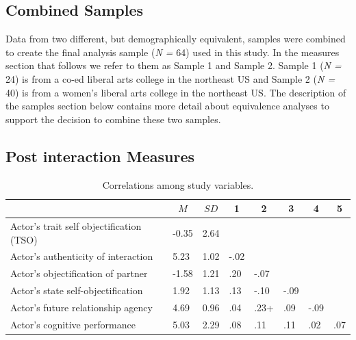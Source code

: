 \documentclass[man]{apa6}
\begin{document}
\subsection{Combined Samples}\label{combined-samples}

Data from two different, but demographically equivalent, samples were
combined to create the final analysis sample (\emph{N =} 64) used in
this study. In the measures section that follows we refer to them as
Sample 1 and Sample 2. Sample 1 (\emph{N =} 24) is from a co-ed liberal
arts college in the northeast US and Sample 2 (\emph{N =} 40) is from a
women's liberal arts college in the northeast US. The description of the
samples section below contains more detail about equivalence analyses to
support the decision to combine these two samples.

\subsection{Post interaction Measures}\label{post-interaction-measures}

\begin{table}[tbp]
\begin{center}
\begin{threeparttable}
\caption{\label{tab:corrtable}Correlations among study variables.}
\begin{tabular}{llllllll}
\toprule
 & \multicolumn{1}{c}{$M$} & \multicolumn{1}{c}{$SD$} & \multicolumn{1}{c}{1} & \multicolumn{1}{c}{2} & \multicolumn{1}{c}{3} & \multicolumn{1}{c}{4} & \multicolumn{1}{c}{5}\\
\midrule
Actor's trait self objectification (TSO) & -0.35 & 2.64 &  &  &  &  & \\
Actor's authenticity of interaction & 5.23 & 1.02 & -.02 &  &  &  & \\
Actor's objectification of partner & -1.58 & 1.21 & .20 & -.07 &  &  & \\
Actor's state self-objectification & 1.92 & 1.13 & .13 & -.10 & -.09 &  & \\
Actor's future relationship agency & 4.69 & 0.96 & .04 & .23+ & .09 & -.09 & \\
Actor's cognitive performance & 5.03 & 2.29 & .08 & .11 & .11 & .02 & .07\\
\bottomrule
\end{tabular}
\end{threeparttable}
\end{center}
\end{table}
\end{document}
